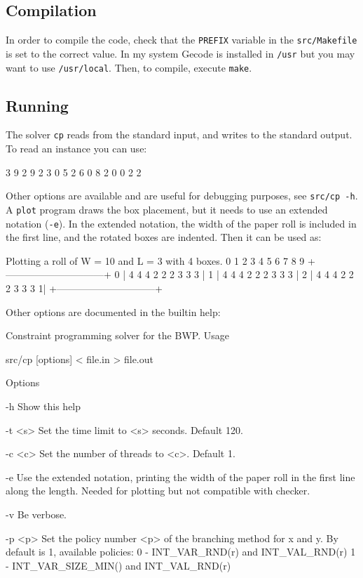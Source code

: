 \documentclass[a4paper]{article}
\begin{document}
\subsection{Compilation}

In order to compile the code, check that the \texttt{PREFIX} variable in the 
\texttt{src/Makefile} is set to the correct value. In my system Gecode is 
installed in \texttt{/usr} but you may want to use \texttt{/usr/local}. Then, to 
compile, execute \texttt{make}.

\subsection{Running}

The solver \texttt{cp} reads from the standard input, and writes to the standard 
output. To read an instance you can use:
%
\begin{textcode}
3
9 2     9 2
3 0     5 2
6 0     8 2
0 0     2 2
\end{textcode}
%
Other options are available and are useful for debugging purposes, see 
\texttt{src/cp -h}. A \texttt{plot} program draws the box placement, but it 
needs to use an extended notation (\texttt{-e}). In the extended notation, the 
width of the paper roll is included in the first line, and the rotated boxes are 
indented.  Then it can be used as:
%
\begin{textcode}
Plotting a roll of W = 10 and L = 3 with 4 boxes.
      0  1  2  3  4  5  6  7  8  9
   +------------------------------+
 0 |  4  4  4  2  2  2  3  3  3   |
 1 |  4  4  4  2  2  2  3  3  3   |
 2 |  4  4  4  2  2  2  3  3  3  1|
   +------------------------------+
\end{textcode}
%
Other options are documented in the builtin help:
\begin{textcode}
Constraint programming solver for the BWP.
Usage

	src/cp [options] < file.in > file.out

Options

  -h       Show this help

  -t <s>   Set the time limit to <s> seconds. Default 120.

  -c <c>   Set the number of threads to <c>. Default 1.

  -e       Use the extended notation, printing the width
           of the paper roll in the first line along the length.
           Needed for plotting but not compatible with checker.

  -v       Be verbose.

  -p <p>   Set the policy number <p> of the branching method for x and y.
           By default is 1, available policies:
             0 - INT_VAR_RND(r) and INT_VAL_RND(r)
             1 - INT_VAR_SIZE_MIN() and INT_VAL_RND(r)

\end{textcode}
\end{document}
